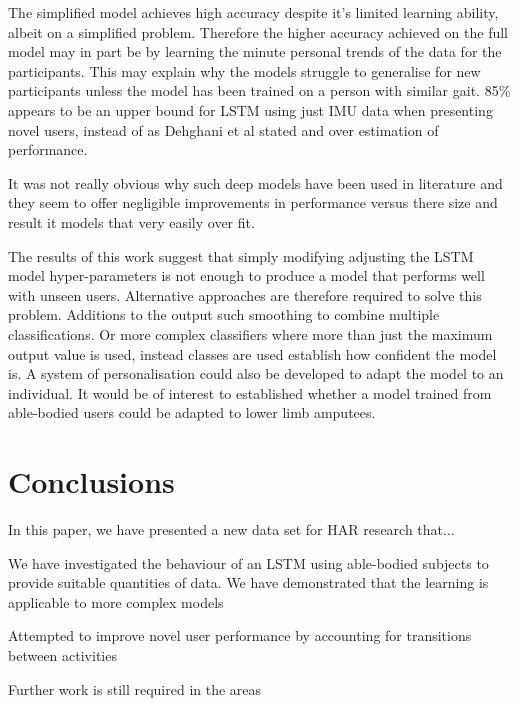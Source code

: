 \documentclass[sensors,article,submit,moreauthors,pdftex]{Definitions/mdpi}
\begin{document}
The simplified model achieves high accuracy despite it's limited learning ability, albeit on a simplified problem. Therefore the higher accuracy achieved on the full model may in part be by learning the minute personal trends of the data for the participants. This may explain why the models struggle to generalise for new participants unless the model has been trained on a person with similar gait. 85\% appears to be an upper bound for LSTM using just IMU data when presenting novel users, instead of as Dehghani et al stated and over estimation of performance.

It was not really obvious why such deep models have been used in literature and they seem to offer negligible improvements in performance versus there size and result it models that very easily over fit.

The results of this work suggest that simply modifying adjusting the LSTM model hyper-parameters is not enough to produce a model that performs well with unseen users. Alternative approaches are therefore required to solve this problem. Additions to the output such smoothing to combine multiple classifications. Or more complex classifiers where more than just the maximum output value is used, instead classes are used establish how confident the model is. A system of personalisation could also be developed to adapt the model to an individual. It would be of interest to established whether a model trained from able-bodied users could be adapted to lower limb amputees.

\section{Conclusions}
\label{sec:conclusion}

In this paper, we have presented a new data set for HAR research that...

We have investigated the behaviour of an LSTM using able-bodied subjects to provide suitable quantities of data. We have demonstrated that the learning is applicable to more complex models

Attempted to improve novel user performance by accounting for transitions between activities

Further work is still required in the areas

\vspace{6pt} 
\end{document}
